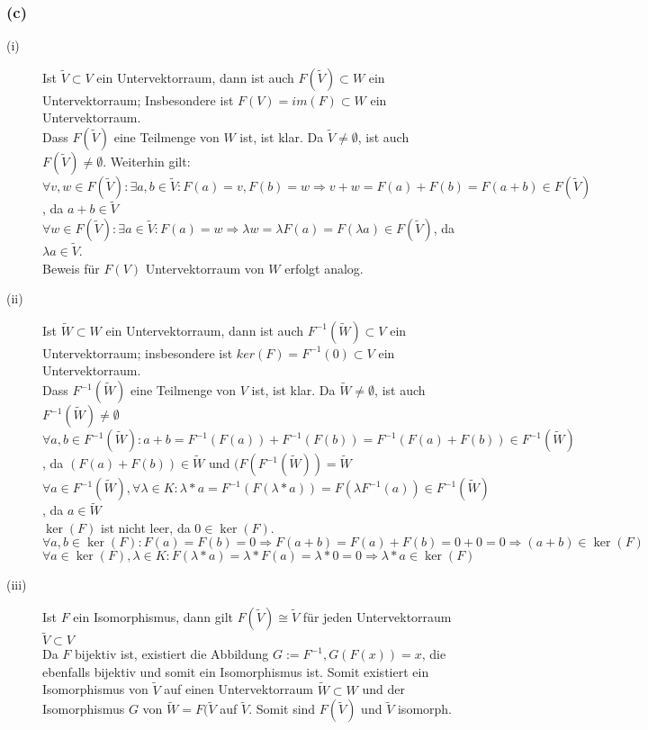 \documentclass[12pt]{article}
\begin{document}
\subsubsection*{(c)}
\begin{description}
\item[(i)] Ist $\tilde{V}{\subset}V$ ein Untervektorraum, dann ist auch $F(\tilde{V}){\subset}W$ ein Untervektorraum; Insbesondere ist $F(V)=im(F){\subset}W$ ein Untervektorraum.\\
Dass $F(\tilde{V})$ eine Teilmenge von $W$ ist, ist klar. Da $\tilde{V}\neq\emptyset$, ist auch $F(\tilde{V})\neq\emptyset$. Weiterhin gilt:\\
$\forall v,w \in F(\tilde{V}): \exists a,b \in \tilde{V}: F(a)=v, F(b)=w \Rightarrow v+w=F(a)+F(b)=F(a+b) \in F(\tilde{V})$, da $a+b\in\tilde{V}$\\
$\forall w \in F(\tilde{V}): \exists a \in\tilde{V}: F(a)=w \Rightarrow {\lambda}w={\lambda}F(a)=F({\lambda}a) \in F(\tilde{V})$, da ${\lambda}a\in\tilde{V}$.\\
Beweis f{\"u}r $F(V)$ Untervektorraum von $W$ erfolgt analog.
\item[(ii)] Ist $\tilde{W}{\subset}W$ ein Untervektorraum, dann ist auch $F^{-1}(\tilde{W}){\subset}V$ ein Untervektorraum; insbesondere ist $ker(F)=F^{-1}({0}){\subset}V$ ein Untervektorraum.\hfill\\
Dass $F^{-1}(\tilde{W})$ eine Teilmenge von $V$ ist, ist klar. Da $\tilde{W}\neq\emptyset$, ist auch $F^{-1}(\tilde{W})\neq\emptyset$\\
$\forall a,b {\in}F^{-1}(\tilde{W}):a+b=F^{-1}(F(a))+F^{-1}(F(b))=F^{-1}(F(a)+F(b)){\in}F^{-1}(\tilde{W})$, da $(F(a)+F(b)){\in}\tilde{W}$ und $(F(F^{-1}(\tilde{W}))=\tilde{W}$ \\
$\forall a{\in}F^{-1}(\tilde{W}), \forall \lambda \in K: \lambda*a=F^{-1}(F(\lambda*a))=F({\lambda}F^{-1}(a)){\in}F^{-1}(\tilde{W})$, da  $a \in \tilde{W}$\\
$\ker(F)$ ist nicht leer, da $0\in\ker(F)$.\\
$\forall a,b \in \ker(F): F(a)=F(b)=0 \Rightarrow F(a+b)=F(a)+F(b)=0+0=0 \Rightarrow (a+b) \in \ker(F)$\\
$\forall a \in \ker(F), \lambda \in K: F(\lambda*a)=\lambda*F(a)=\lambda*0=0 \Rightarrow \lambda*a \in \ker(F)$ 
\item[(iii)] Ist $F$ ein Isomorphismus, dann gilt $F(\tilde{V})\cong\tilde{V}$ f{\"u}r jeden Untervektorraum $\tilde{V}{\subset}V$\hfill\\
Da $F$ bijektiv ist, existiert die Abbildung $G:=F^{-1}, G(F(x))=x$, die ebenfalls bijektiv und somit ein Isomorphismus ist. Somit existiert ein Isomorphismus von $\tilde{V}$ auf einen Untervektorraum $\tilde{W} \subset W$ und der Isomorphismus $G$ von $\tilde{W}=F(\tilde{V}$ auf $\tilde{V}$. Somit sind $F(\tilde{V})$ und $\tilde{V}$ isomorph.
\end{description}
\end{document}
